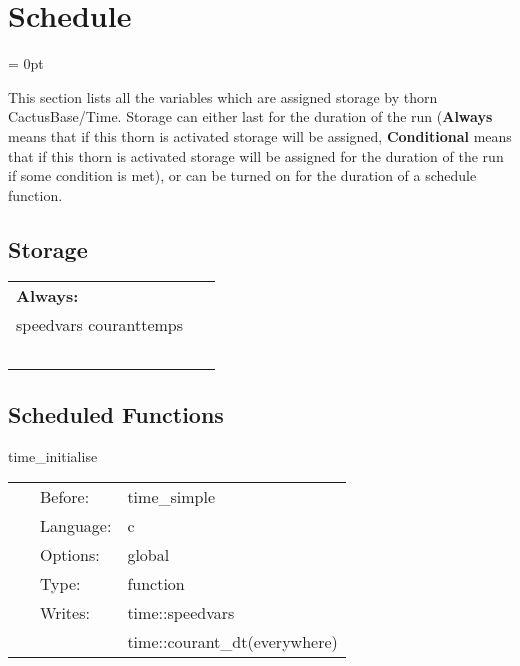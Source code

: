 
\section{Schedule} 


\parskip = 0pt


\noindent This section lists all the variables which are assigned storage by thorn CactusBase/Time.  Storage can either last for the duration of the run ({\bf Always} means that if this thorn is activated storage will be assigned, {\bf Conditional} means that if this thorn is activated storage will be assigned for the duration of the run if some condition is met), or can be turned on for the duration of a schedule function.


\subsection*{Storage}

\hspace{5mm}

 \begin{tabular*}{160mm}{ll} 

{\bf Always:}&  ~ \\ 
 speedvars couranttemps & ~\\ 
~ & ~\\ 
\end{tabular*} 


\subsection*{Scheduled Functions}
\vspace{5mm}


\hspace{5mm} time\_initialise 

\hspace{5mm}{\it initialise time variables } 


\hspace{5mm}

 \begin{tabular*}{160mm}{cll} 
~ & Before:  & time\_simple \\ 
~ & Language:  & c \\ 
~ & Options:  & global \\ 
~ & Type:  & function \\ 
~ & Writes:  & time::speedvars \\ 
~& ~ &time::courant\_dt(everywhere)\\ 
\end{tabular*} 


